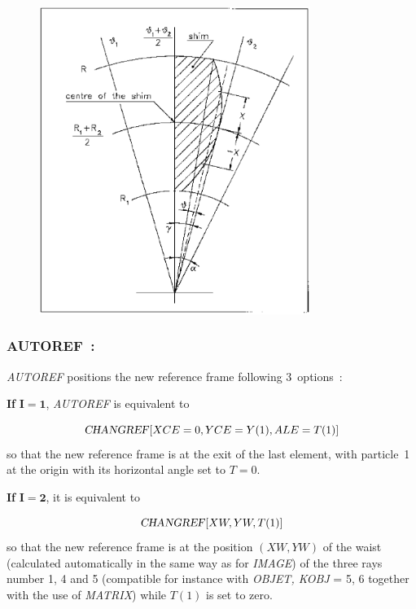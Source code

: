 \vfill 

\begin{figure}[H]
\centerline{\includegraphics[height=10cm]{Fig13.ps}}
{\setlength{\captionwidth}{14cm}
   }
\end{figure}




\newpage

\subsubsection*{AUTOREF~: \AUTOREFTitl}\label{AUTOREF} 
\medskip

\textsl{AUTOREF} positions the new reference frame following 3~options~:
\bigskip

\noindent\textbf{If} $\mathbf{I = 1}$, \textsl{AUTOREF} is equivalent to 

$$ \text{\textsl{CHANGREF}} \lbrack XCE=0, YCE=Y(1), ALE=T(1)\rbrack $$
%
 so that the new reference frame is at the exit of the last element,
with particle~1 at the origin with its horizontal angle set to $ T=0$.   

\bigskip

\noindent\textbf{If} $\mathbf{I=2}$, it is equivalent to

$$ \text{\textsl{CHANGREF}} \lbrack XW, YW, T(1)\rbrack $$
%
 so that the new reference frame is at the position $ (XW, YW) $ of
the waist (calculated automatically in the same way as for 
\textsl{IMAGE}) of the three rays number 1, 4 and 5 (compatible for instance
with \textsl{OBJET, KOBJ}  =  5, 6 together with the 
use of \textsl{MATRIX}) while $T(1)$ is set to zero.  

